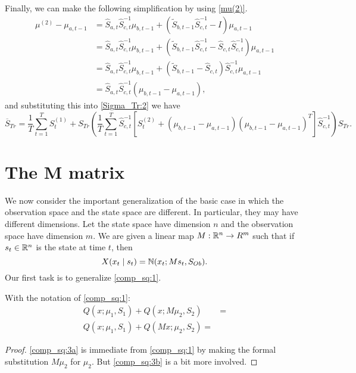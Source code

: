 \documentclass[12pt,leqno]{article}
\begin{document}
Finally, we can make the following simplification by using \eqref{mu(2)}.
\begin{align*}
  \mu^{(2)} - \mu_{a,t-1} &= \widehat{S}_{a,t}\widehat{S}_{c,t}^{-1}\mu_{b,t-1} +
  (\widetilde{S}_{b,t-1}\widehat{S}_{c,t}^{-1}-I)\mu_{a,t-1}\\
  &= \widehat{S}_{a,t}\widehat{S}_{c,t}^{-1}\mu_{b,t-1} +
  (\widetilde{S}_{b,t-1}\widehat{S}_{c,t}^{-1}-\widehat{S}_{c,t}\widehat{S}_{c,t}^{-1})\mu_{a,t-1}\\
  &=  \widehat{S}_{a,t}\widehat{S}_{c,t}^{-1}\mu_{b,t-1} +
  (\widetilde{S}_{b,t-1}-\widehat{S}_{c,t})\widehat{S}_{c,t}^{-1}\mu_{a,t-1}\\
  &= \widehat{S}_{a,t}\widehat{S}_{c,t}^{-1}(\mu_{b,t-1} -\mu_{a,t-1}),
\end{align*}
and substituting this into \eqref{Sigma_Tr:2} we have
\begin{equation}\label{Sigma_Tr:3}
\overline{S}_{Tr}   =\frac{1}{T}\sum_{t=1}^TS^{(1)}_t+S_{Tr}\left(\frac{1}{T}\sum_{t=1}^T\widehat{S}_{c,t}^{-1}
   [S^{(2)}_t+(\mu_{b,t-1}-\mu_{a,t-1})(\mu_{b,t-1}-\mu_{a,t-1})^T]\widehat{S}_{c,t}^{-1}\right)S_{Tr}.
\end{equation}  

\section{The M matrix}
We now consider the important generalization of the basic case in which the observation space and the state space are different.
In particular, they may have different dimensions.  Let the state space have dimension $n$ and the observation space have
dimension $m$.  We are given a linear map $M: {\mathbb R}^n\rightarrow R^m$ such that if $s_t\in {\mathbb R}^n$ is the state at time $t$, then
$$
X(x_t\mid s_t)= {\mathbb N}(x_t;Ms_t,S_{Ob}).
$$
Our first task is to generalize \eqref{comp_sq:1}.

\begin{Lem}\label{comp_sq:3}
With the notation of \eqref{comp_sq:1}:
\begin{align}
  Q(x;\mu_1,S_1) + Q(x;M\mu_2,S_2) &= \label{comp_sq:3a}\\
  Q(x;\mu_1,S_1) + Q(Mx;\mu_2,S_2) = \label{comp_sq:3b}
\end{align}
\end{Lem}
\begin{proof}
\eqref{comp_sq:3a} is immediate from \eqref{comp_sq:1} by making the formal substitution $M\mu_2$ for $\mu_2$.  But \eqref{comp_sq:3b} is a bit more involved.  

\end{proof}
\end{document}
